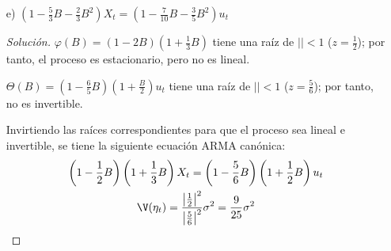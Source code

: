 \begin{ejemplo}
\begin{enumerate}
\item[e)] $\left(1-\frac{5}{3}B-\frac{2}{3}B^{2}\right)X_{t} =\left(1-\frac{7}{10}B-\frac{3}{5}B^{2}\right)u_{t} $ 
\begin{proof}[Soluci\'{o}n]
$\varphi (B)=(1-2B)(1+\frac{1}{3}B)$ tiene una ra\'{i}z de $\left| \right|< 1$ ($z=\frac{1}{2}$); por tanto, el proceso es estacionario, pero no es lineal.\newline

$\Theta (B)=\left( {1-\frac{6}{5}B} \right)\left( {1+\frac{B}{2}} \right)u_{t} $ tiene una ra\'{i}z de $\left| \right|< 1$ ($z=\frac{5}{6}$); por tanto, no es invertible.\newline

Invirtiendo las ra\'{i}ces correspondientes para que el proceso sea lineal e invertible, se tiene la siguiente ecuaci\'{o}n ARMA can\'{o}nica:
\begin{gather*}
\left(1-\frac{1}{2}B\right)\left(1+\frac{1}{3}B\right)X_{t} =\left(1-\frac{5}{6}B\right)\left(1+\frac{1}{2}B\right)u_{t} 
\\
\V(\eta_{t} )=\frac{\left| {\frac{1}{2}} \right|^{2}}{\left| {\frac{5}{6}} 
\right|^{2}}\sigma^{2}=\frac{9}{25}\sigma^{2}
\end{gather*}
\end{proof}
\end{enumerate}
\end{ejemplo}


